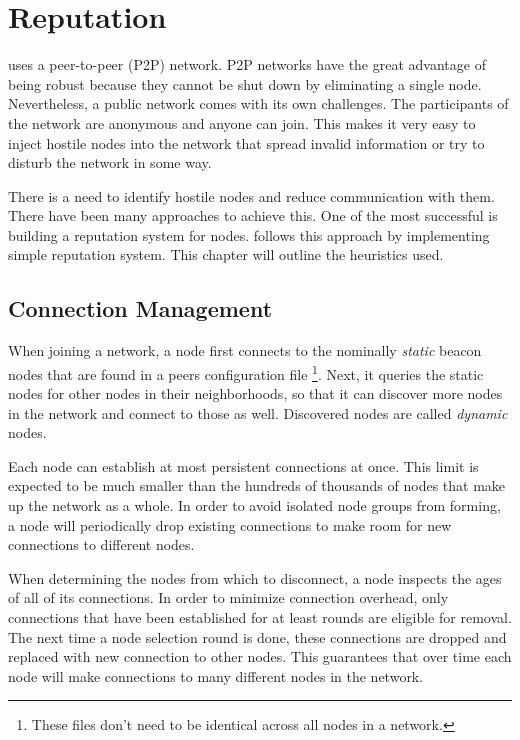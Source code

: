 \section{Reputation}
\label{sec:reputation}


\codenamechapterfirstword uses a peer-to-peer (P2P) network.
P2P networks have the great advantage of being robust because they cannot be shut down by eliminating a single node.
Nevertheless, a public network comes with its own challenges.
The participants of the network are anonymous and anyone can join.
This makes it very easy to inject hostile nodes into the network that spread invalid information or try to disturb the network in some way.

There is a need to identify hostile nodes and reduce communication with them.
There have been many approaches to achieve this.
One of the most successful is building a reputation system for nodes.
\codenamespace follows this approach by implementing simple reputation system.
This chapter will outline the heuristics used.

\subsection{Connection Management}
\label{sec:reputation:ConnectionManagement}

When joining a network, a node first connects to the nominally {\it static} beacon nodes that are found in a peers configuration file
\footnote{These files don't need to be identical across all nodes in a network.}.
Next, it queries the static nodes for other nodes in their neighborhoods, so that it can discover more nodes in the network and connect to those as well.
Discovered nodes are called {\it dynamic} nodes.

Each node can establish at most  persistent connections at once.
This limit is expected to be much smaller than the hundreds of thousands of nodes that make up the network as a whole.
In order to avoid isolated node groups from forming, a node will periodically drop existing connections to make room for new connections to different nodes.

When determining the nodes from which to disconnect, a node inspects the ages of all of its connections.
In order to minimize connection overhead, only connections that have been established for at least  rounds are eligible for removal.
The next time a node selection round is done, these connections are dropped and replaced with new connection to other nodes.
This guarantees that over time each node will make connections to many different nodes in the network.


